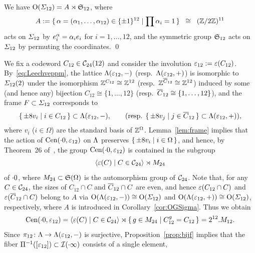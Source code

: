 \documentclass{amsart} %
\begin{document}
%
\begin{corollary}\label{cor:OGSigma}
We have $\mathord{\mathrm{O}}(\varSigma_{12})=A\rtimes\mathord{\mathfrak{S}}_{12}$,
where
\[
A:=\{\,{\alpha=(\alpha_1, \dots, \alpha_{12})\in \{\pm 1\}^{12}}\mid {\prod\alpha_i=1} \,\}\;\; \cong\;\; (\mathord{\mathbb{Z}}/2\mathord{\mathbb{Z}})^{11}
\]
acts on $\varSigma_{12}$ by $e_i\sp{\alpha}=\alpha_i e_i$ for $i=1, \dots, 12$, 
and
the symmetric group $\mathord{\mathfrak{S}}_{12}$ 
acts on $\varSigma_{12}$ by permuting the coordinates.
\qed
\end{corollary}
%
We fix a codeword $C_{12}\in \mathord{\mathcal{C}}_{24}(12)$ and 
consider the involution 
$\varepsilon_{12}:=\varepsilon(C_{12})$.
%
By~\eqref{eq:Leechveppm}, 
the lattice $\Lambda (\varepsilon_{12}, -)$ (resp.~$\Lambda (\varepsilon_{12}, +)$)
is isomorphic 
 to $\varSigma_{12} (2)$ under 
the isomorphism $\mathord{\mathbb{Z}}^{C_{12}}\cong \mathord{\mathbb{Z}}^{12}$ (resp.~$\mathord{\mathbb{Z}}^{\overline{C}_{12}}\cong \mathord{\mathbb{Z}}^{12}$)
induced by some (and hence any) bijection 
$C_{12}\cong \{1, \dots, 12\}$ (resp.~$\overline{C}_{12}\cong \{1, \dots, 12\}$),
and the frame $F\subset \varSigma_{12}$ corresponds to
\[
\{\,{\pm 8 v_i}\mid {i\in C_{12}} \,\}\subset \Lambda(\varepsilon_{12}, -),
\qquad 
(\textrm{resp. }
\{\,{\pm 8 v_j}\mid {j\in \overline{C}_{12}} \,\}\subset \Lambda(\varepsilon_{12}, +)),
\]
where $v_i$ ($i\in \Omega$) are the standard basis of $\mathord{\mathbb{Z}}^{\Omega}$.
Lemma~\ref{lem:frame}
implies that the action of $\mathrm{Cen}(\cdot 0, \varepsilon_{12})$ 
on $\Lambda$ preserves $\{\,{\pm 8 v_i}\mid {i\in \Omega} \,\}$,
and hence, by Theorem~26 of~\cite[Chapter~10, Section~3.3]{theCSbook}, 
the group $\mathrm{Cen}(\cdot 0, \varepsilon_{12}) $ is contained 
in the subgroup
\[
\langle {\varepsilon(C) \mid C \in \mathord{\mathcal{C}}_{24}} \rangle\rtimes M_{24} 
\]
of $\cdot 0$,
where $M_{24}\subset \mathord{\mathfrak{S}}(\Omega)$ is the automorphism group of $ \mathord{\mathcal{C}}_{24}$.
Note that, for any $C\in \mathord{\mathcal{C}}_{24}$,
the sizes of $C_{12}\cap C$ and $\overline{C}_{12}\cap C$
are even, and hence 
$\varepsilon(C_{12}\cap C)$ and $\varepsilon( \overline{C}_{12}\cap C)$ belong to $ A$ via 
$ \mathord{\mathrm{O}}(\Lambda(\varepsilon_{12}, -))\cong \mathord{\mathrm{O}}(\varSigma_{12})$ and $ \mathord{\mathrm{O}}(\Lambda(\varepsilon_{12}, +))\cong \mathord{\mathrm{O}}(\varSigma_{12})$,
respectively,
where $A$ is introduced in Corollary~\ref{cor:OGSigma}.
Thus we obtain 
%
\begin{equation}\label{eq:M12}
\mathrm{Cen}(\cdot 0, \varepsilon_{12})=\langle {\varepsilon(C) \mid C \in \mathord{\mathcal{C}}_{24}} \rangle\rtimes \{\,{g\in M_{24}}\mid {C_{12}^g=C_{12}} \,\}=2^{12}. M_{12}.
\end{equation}
%
Since $\pi_{12}\colon \Lambda\to \Lambda(\varepsilon_{12}, -)$ is surjective,
Proposition~\ref{prop:bijf} implies that the fiber $\Pi^{-1} ([\varepsilon_{12}])\subset \mathord{\mathcal{I}}(\cdot \infty)$ consists of a single element,
\end{document}
